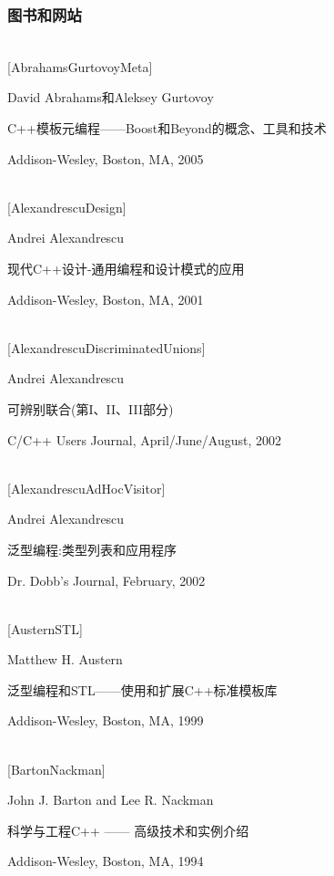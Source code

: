\subsubsection*{图书和网站}

\hspace*{\fill} \\ %
{[AbrahamsGurtovoyMeta]}

David Abrahams和Aleksey Gurtovoy

C++模板元编程——Boost和Beyond的概念、工具和技术
 
Addison-Wesley, Boston, MA, 2005

\hspace*{\fill} \\ %
{[AlexandrescuDesign]}

Andrei Alexandrescu

现代C++设计-通用编程和设计模式的应用

Addison-Wesley, Boston, MA, 2001

\hspace*{\fill} \\ %
{[AlexandrescuDiscriminatedUnions]}

Andrei Alexandrescu

可辨别联合(第I、II、III部分)

C/C++ Users Journal, April/June/August, 2002

\hspace*{\fill} \\ %
{[AlexandrescuAdHocVisitor]}

Andrei Alexandrescu

泛型编程:类型列表和应用程序

Dr. Dobb’s Journal, February, 2002

\hspace*{\fill} \\ %
{[AusternSTL]}

Matthew H. Austern

泛型编程和STL——使用和扩展C++标准模板库

Addison-Wesley, Boston, MA, 1999

\hspace*{\fill} \\ %
{[BartonNackman]}

John J. Barton and Lee R. Nackman

科学与工程C++ —— 高级技术和实例介绍

Addison-Wesley, Boston, MA, 1994

